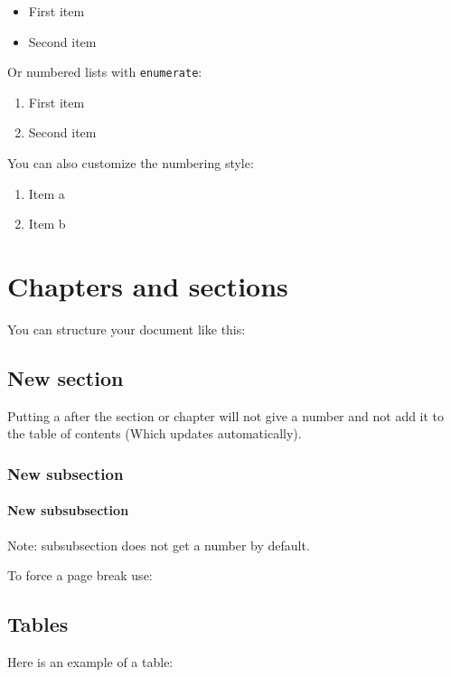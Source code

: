 \begin{itemize}
    \item First item
    \item Second item
\end{itemize}
Or numbered lists with \texttt{enumerate}:

\begin{enumerate}
    \item First item
    \item Second item
\end{enumerate}
You can also customize the numbering style:

\begin{enumerate}[label=\alph*]
    \item Item a
    \item Item b
\end{enumerate}


\chapter*{Chapters and sections} \label{ch:placeholder}
You can structure your document like this:

\section*{New section} \label{sec:placeholder}
Putting a \* after the section or chapter will not give a number and not add it to the table of contents (Which updates automatically).

\subsection*{New subsection} \label{sec:sub_placeholder}

\subsubsection{New subsubsection} \label{sec:subsub_placeholder}
Note: subsubsection does not get a number by default.

To force a page break use:
\newpage



\section*{Tables}
Here is an example of a table:

